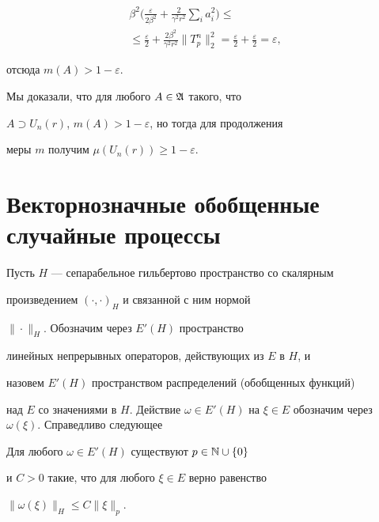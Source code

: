 \begin{pf}
\begin{gather*}
\beta^2 \bigg(\frac{\varepsilon}{2\beta^2}+


\frac{2}{\gamma^2 r^2}\sum\limits_{i}a_i^2\bigg)\leq\\


%


\leq\frac{\varepsilon}{2}+\frac{2\beta^2}{\gamma^2 r^2}\|T^n_p\|^2_2=


\frac{\varepsilon}{2} +\frac{\varepsilon}{2}=\varepsilon,


\end{gather*}


отсюда $m(A)>1-\varepsilon$.





Мы доказали, что для любого $A\in\frak{A}$ такого, что


$A\supset U_n(r)$, $m(A)>1-\varepsilon$, но тогда для продолжения


меры $m$ получим $\mu (U_n(r))\geq 1-\varepsilon$.


\end{pf}








\section{Векторнозначные обобщенные случайные процессы}





Пусть $H$ --- сепарабельное гильбертово пространство со скалярным


произведением $(\cdot,\cdot)_H$ и связанной с ним нормой


$\|\cdot\|_H$. Обозначим через $E'(H)$ пространство


линейных непрерывных операторов, действующих из $E$ в $H$, и


назовем $E'(H)$ пространством распределений (обобщенных функций)


над $E$ со значениями в $H$. Действие $\omega\in E'(H)$ на $\xi\in


E$ обозначим через $\omega(\xi)$. Справедливо следующее





\begin{prop}\label{mx005}


Для любого $\omega\in E'(H)$ существуют $ p\in\Bbb{N}\cup\{0\}$


и $C>0$ такие, что для любого $\xi \in E$ верно равенство


$\|\omega(\xi)\|_H\leq C\|\xi\|_p$.


\end{prop}





